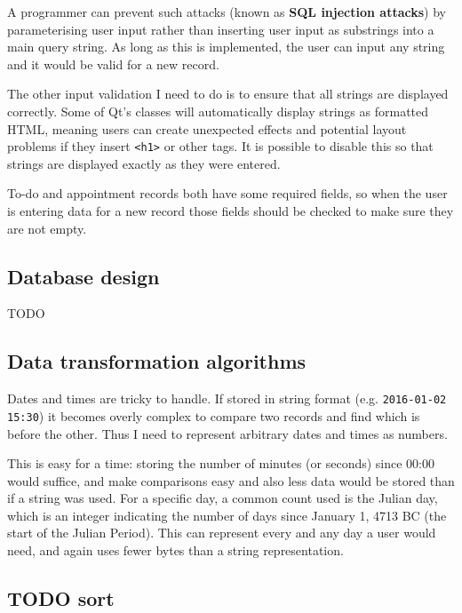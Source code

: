 A programmer can prevent such attacks (known as \textbf{SQL injection
attacks}) by parameterising user input rather than inserting user input as
substrings into a main query string. As long as this is implemented, the user
can input any string and it would be valid for a new record.

The other input validation I need to do is to ensure that all strings are
displayed correctly. Some of Qt's classes will automatically display strings as
formatted HTML, meaning users can create unexpected effects and potential layout
problems if they insert \texttt{<h1>} or other tags. It is possible to disable
this so that strings are displayed exactly as they were entered.

To-do and appointment records both have some required fields, so when the user
is entering data for a new record those fields should be checked to make sure
they are not empty.


\subsection{Database design}

TODO


\subsection{Data transformation algorithms}

Dates and times are tricky to handle. If stored in string format (e.g.
\texttt{2016-01-02 15:30}) it becomes overly complex to compare two records and
find which is before the other. Thus I need to represent arbitrary dates and
times as numbers.

This is easy for a time: storing the number of minutes (or seconds) since 00:00
would suffice, and make comparisons easy and also less data would be stored than
if a string was used. For a specific day, a common count used is the Julian day,
which is an integer indicating the number of days since January 1, 4713 BC (the
start of the Julian Period). This can represent every and any day a user would
need, and again uses fewer bytes than a string representation.




\subsection{TODO sort}

\newcommand{\classitem}[1]{\item \textbf{#1}}

